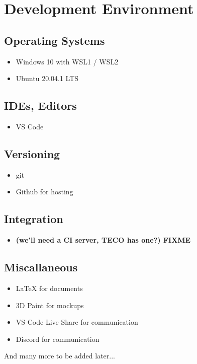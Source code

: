 \section{Development Environment}
\subsection{Operating Systems}
\begin{itemize}
    \item Windows 10 with WSL1 / WSL2
    \item Ubuntu 20.04.1 LTS
\end{itemize}
\subsection{IDEs, Editors}
\begin{itemize}
    \item VS Code
\end{itemize}
\subsection{Versioning}
\begin{itemize}
    \item git
    \item Github for hosting
\end{itemize}
\subsection{Integration}
\begin{itemize} %
    \item \textbf{(we'll need a CI server, TECO has one?) FIXME}
\end{itemize}
\subsection{Miscallaneous}
\begin{itemize}
    \item {\LaTeX} for documents
    \item 3D Paint for mockups %
    \item VS Code Live Share for communication
    \item Discord for communication
\end{itemize}

And many more to be added later...